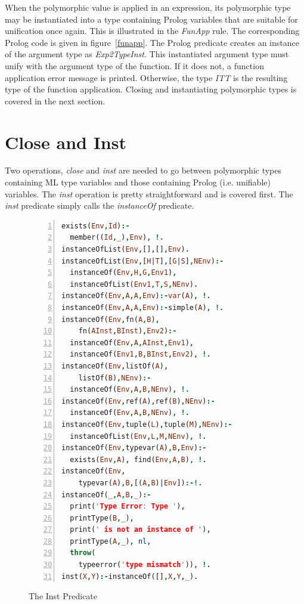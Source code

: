 \documentclass[10pt]{luthercs}
\begin{document}
When the polymorphic value is applied in an expression, its polymorphic type may be instantiated into a type containing Prolog variables that are suitable for unification once again. This is illustrated in the {\em FunApp} rule. The corresponding Prolog code is given in figure~\ref{funapp}. The Prolog predicate creates an instance of the argument type as {\em Exp2TypeInst}. This instantiated argument type must unify with the argument type of the function. If it does not, a function application error message is printed. Otherwise, the type {\em ITT} is the resulting type of the function application. Closing and instantiating polymorphic types is covered in the next section. 

\section{Close and Inst}

Two operations, {\em close} and {\em inst} are needed to go between polymorphic types containing ML type variables and those containing Prolog (i.e. unifiable) variables. 
The {\em inst} operation is pretty straightforward and is covered first. The {\em inst} predicate simply calls the {\em instanceOf} predicate.

\begin{figure}[htbp]
\begin{lstlisting}[language=Prolog,numbers=left,numberstyle=\tiny]
exists(Env,Id):- 
  member((Id,_),Env), !.
instanceOfList(Env,[],[],Env).
instanceOfList(Env,[H|T],[G|S],NEnv):- 
  instanceOf(Env,H,G,Env1), 
  instanceOfList(Env1,T,S,NEnv).
instanceOf(Env,A,A,Env):-var(A), !.
instanceOf(Env,A,A,Env):-simple(A), !. 
instanceOf(Env,fn(A,B), 
    fn(AInst,BInst),Env2):-  
  instanceOf(Env,A,AInst,Env1), 
  instanceOf(Env1,B,BInst,Env2), !.
instanceOf(Env,listOf(A),
    listOf(B),NEnv):- 
  instanceOf(Env,A,B,NEnv), !.
instanceOf(Env,ref(A),ref(B),NEnv):- 
  instanceOf(Env,A,B,NEnv), !. 
instanceOf(Env,tuple(L),tuple(M),NEnv):- 
  instanceOfList(Env,L,M,NEnv), !.
instanceOf(Env,typevar(A),B,Env):- 
  exists(Env,A), find(Env,A,B), !.
instanceOf(Env,
    typevar(A),B,[(A,B)|Env]):-!.
instanceOf(_,A,B,_):- 
  print('Type Error: Type '), 
  printType(B,_), 
  print(' is not an instance of '), 
  printType(A,_), nl, 
  throw(
    typeerror('type mismatch')), !.
inst(X,Y):-instanceOf([],X,Y,_).
\end{lstlisting}
\caption{The Inst Predicate}
\label{inst}
\end{figure}
\end{document}
